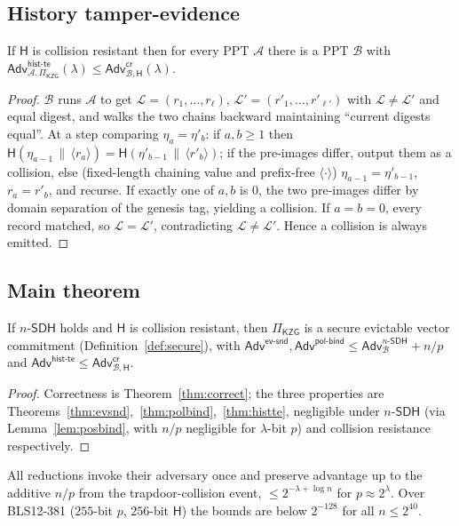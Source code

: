 \documentclass[version=preprint]{iacrcc}
\theoremstyle{definition}
\newcommand{\secpar}{\lambda}
\newcommand{\PPT}{\mathrm{PPT}}
\newcommand{\concat}{\,\|\,}
\newcommand{\Adv}{\mathsf{Adv}}
\newcommand{\A}{\mathcal{A}}
\newcommand{\B}{\mathcal{B}}
\newcommand{\hash}{\mathsf{H}}
\newcommand{\Log}{\mathcal{L}}
\newcommand{\nsdh}{n\text{-}\mathsf{SDH}}
\newcommand{\evsnd}{\mathsf{ev\text{-}snd}}
\newcommand{\polbind}{\mathsf{pol\text{-}bind}}
\newcommand{\histte}{\mathsf{hist\text{-}te}}
\newcommand{\collres}{\mathsf{cr}}
\begin{document}
\subsection{History tamper-evidence}

\begin{theorem}\label{thm:histte}
If $\hash$ is collision resistant then for every $\PPT$ $\A$ there is a $\PPT$
$\B$ with $\Adv^{\histte}_{\A,\Pi_{\mathsf{KZG}}}(\secpar)\le
\Adv^{\collres}_{\B,\hash}(\secpar)$.
\end{theorem}
\begin{proof}
$\B$ runs $\A$ to get $\Log=(r_1,\dots,r_\ell)$, $\Log'=(r'_1,\dots,r'_{\ell'})$
with $\Log\neq\Log'$ and equal digest, and walks the two chains backward
maintaining ``current digests equal''. At a step comparing $\eta_a=\eta'_b$: if
$a,b\ge1$ then $\hash(\eta_{a-1}\concat\langle r_a\rangle)=\hash(\eta'_{b-1}
\concat\langle r'_b\rangle)$; if the pre-images differ, output them as a
collision, else (fixed-length chaining value and prefix-free $\langle\cdot
\rangle$) $\eta_{a-1}=\eta'_{b-1}$, $r_a=r'_b$, and recurse. If exactly one of
$a,b$ is $0$, the two pre-images differ by domain separation of the genesis tag,
yielding a collision. If $a=b=0$, every record matched, so $\Log=\Log'$,
contradicting $\Log\neq\Log'$. Hence a collision is always emitted.
\end{proof}

\subsection{Main theorem}

\begin{theorem}\label{thm:main}
If $\nsdh$ holds and $\hash$ is collision resistant, then $\Pi_{\mathsf{KZG}}$ is
a secure evictable vector commitment (Definition~\ref{def:secure}), with
$\Adv^{\evsnd},\Adv^{\polbind}\le\Adv^{\nsdh}_{\B}+n/p$ and
$\Adv^{\histte}\le\Adv^{\collres}_{\B,\hash}$.
\end{theorem}
\begin{proof}
Correctness is Theorem~\ref{thm:correct}; the three properties are
Theorems~\ref{thm:evsnd},~\ref{thm:polbind},~\ref{thm:histte}, negligible under
$\nsdh$ (via Lemma~\ref{lem:posbind}, with $n/p$ negligible for $\secpar$-bit
$p$) and collision resistance respectively.
\end{proof}

\begin{remark}
All reductions invoke their adversary once and preserve advantage up to the
additive $n/p$ from the trapdoor-collision event, $\le 2^{-\secpar+\log n}$ for
$p\approx2^{\secpar}$. Over BLS12-381 ($255$-bit $p$, $256$-bit $\hash$) the
bounds are below $2^{-128}$ for all $n\le2^{40}$.
\end{remark}
\end{document}
